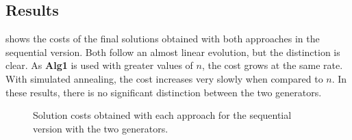 \subsection{Results}
\label{sec:results}

 shows the costs of the final solutions obtained with both approaches in the sequential version. Both follow an almost linear evolution, but the distinction is clear. As \textbf{Alg1} is used with greater values of $n$, the cost grows at the same rate. With simulated annealing, the cost increases very slowly when compared to $n$. In these results, there is no significant distinction between the two generators.

\begin{figure}[!htp]
	\centering
	\hfill
	\caption[Sequential solution costs]{Solution costs obtained with each approach for the sequential version with the two generators.}
	\label{fig:seq}
\end{figure}

